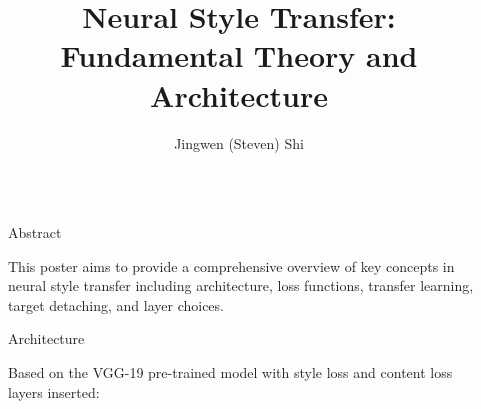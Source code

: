 \documentclass[final]{beamer}
\title{Neural Style Transfer: Fundamental Theory and Architecture}
\author{Jingwen (Steven) Shi}
\institute[shortinst]{University of Toronto}
\newlength{\sepwidth}
\newlength{\colwidth}
\newcommand{\separatorcolumn}{\begin{column}{\sepwidth}\end{column}}
\begin{document}
\begin{frame}[t]
\begin{columns}[t]
\separatorcolumn

\begin{column}{\colwidth}

    \begin{block}{Abstract}
    
        This poster aims to provide a comprehensive overview of key concepts in neural style transfer including architecture, loss functions, transfer learning, target detaching, and layer choices.
    
    \end{block}

    \begin{block}{Architecture}
    
        Based on the VGG-19 pre-trained model with style loss and content loss layers inserted:
        

\end{block}
\end{column}
\end{columns}
\end{frame}
\end{document}
